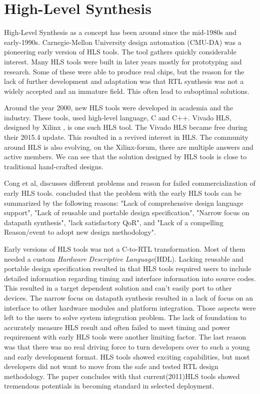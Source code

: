 \section{High-Level Synthesis}
High-Level Synthesis as a concept has been around since the mid-1980s and early-1990s\cite{HLSTutorial}\citep{HLSPastFutur}. Carnegie-Mellon University design automation (CMU-DA)\citep{1085036}\citep{Parker:1979:CDA:800292.811694} was a pioneering early version of HLS tools. The tool gathers quickly considerable interest. Many HLS tools were built in later years mostly for prototyping and research\cite{Granacki:1985:AAD:317825.317970}\citep{Paulin:1986:HMA:318013.318055}\citep{4069894}. Some of these were able to produce real chips, but the reason for the lack of further development and adaptation was that RTL synthesis was not a widely accepted and an immature field. This often lead to suboptimal solutions. 

Around the year 2000, new HLS tools were developed in academia and the industry. These tools, used high-level language, C and C++. Vivado HLS, designed by Xilinx \citep{6409453}, is one such HLS tool. The Vivado HLS became free during their 2015.4 update\citep{VIVADOHLS}. This resulted in a revived interest in HLS. The community around HLS is also evolving, on the Xilinx-forum, there are multiple answers and active members. We can see that the solution designed by HLS tools is close to traditional hand-crafted designs\citep{6718388}.

Cong et al,\cite{HLSTutorial} discusses different problems and reason for failed commercialization of early HLS tools.  concluded that the problem with the early HLS tools can be summarized by the following reasons: "Lack of comprehensive design language support", "Lack of reusable and portable design specification", "Narrow focus on datapath synthesis", "lack satisfactory QoR", and "Lack of a compelling Reason/event to adopt new design methodology".

 Early versions of HLS tools was not a C-to-RTL transformation. Most of them needed a custom \textit{Hardware Descriptive Language}(HDL). Lacking reusable and portable design specification resulted in that HLS tools required users to include detailed information regarding timing and interface information into source codes. This resulted in a target dependent solution and can't easily port to other devices. The narrow focus on datapath synthesis resulted in a lack of focus on an interface to other hardware modules and platform integration. Those aspects were left to the users to solve system integration problem. The lack of foundation to accurately measure HLS result and often failed to meet timing and power requirement with early HLS tools were another limiting factor. The last reason was that there was no real driving force to turn developers over to such a young and early development format. HLS tools showed exciting capabilities, but most developers did not want to move from the safe and tested RTL design methodology. The paper concludes with that current(2011)HLS tools showed tremendous potentials in becoming standard in selected deployment.

